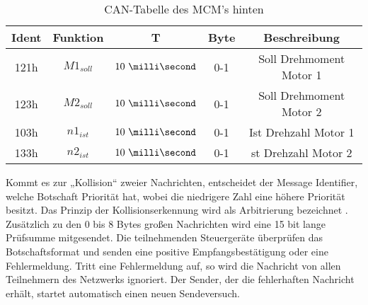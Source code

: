 \begin{table}[H]
	\centering
	\caption{CAN-Tabelle des MCM's hinten}
	\label{tab: CAN-Tabelle des MCM hinten}
	\begin{tabular}{c|c|c|c|c}
		\hline
		Ident       &       Funktion       &           T       &  Byte & Beschreibung  \\ \hline \hline
		121h		&		$M1_{soll}$		&			$10\ \milli\second$ & 0-1 & Soll Drehmoment Motor 1 \\
		123h		&		$M2_{soll}$		&			$10\ \milli\second$ & 0-1 & Soll Drehmoment Motor 2 \\
		103h		&		$n1_{ist}$		&			$10\ \milli\second$ & 0-1 & Ist Drehzahl Motor 1 \\
		133h		&		$n2_{ist}$		&			$10\ \milli\second$ & 0-1 & st Drehzahl Motor 2 \\ \hline
	\end{tabular}
	
\end{table}


Kommt es zur „Kollision“ zweier Nachrichten, entscheidet der Message Identifier, welche Botschaft Priorität hat, wobei die niedrigere Zahl eine höhere Priorität besitzt.
Das Prinzip der Kollisionserkennung wird als Arbitrierung bezeichnet \cite{schmidgall}.\newline
Zusätzlich zu den 0 bis 8 Bytes großen Nachrichten wird eine 15 bit lange Prüfsumme mitgesendet. Die teilnehmenden Steuergeräte überprüfen das Botschaftsformat und senden eine positive Empfangsbestätigung oder eine Fehlermeldung. Tritt eine Fehlermeldung auf, so wird die Nachricht von allen Teilnehmern des Netzwerks ignoriert. Der Sender, der die fehlerhaften Nachricht erhält, startet automatisch einen neuen Sendeversuch. \cite{schmidgall}
				   		


